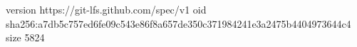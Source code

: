 version https://git-lfs.github.com/spec/v1
oid sha256:a7db5c757ed6fe09c543e86f8a657de350c371984241e3a2475b4404973644c4
size 5824
